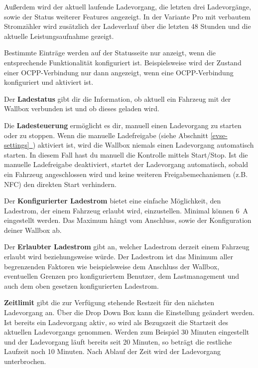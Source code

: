\documentclass[a4paper,10pt]{article}
\newcommand*{\fullref}[1]{Abschnitt \hyperref[{#1}]{\ref*{#1}~\nameref*{#1}}}
\begin{document}
\begin{multicols*}{2}
    Außerdem wird der aktuell laufende Ladevorgang, die letzten drei
    Ladevorgänge, sowie der Status weiterer Features angezeigt.
    In der Variante Pro mit verbautem Stromzähler wird zusätzlich der Ladeverlauf
    über die letzten 48 Stunden und die aktuelle Leistungsaufnahme gezeigt.

    Bestimmte Einträge werden auf der Statusseite nur anzeigt, wenn die entsprechende
    Funktionalität konfiguriert ist. Beispielsweise wird der Zustand einer OCPP-Verbindung
    nur dann angezeigt, wenn eine OCPP-Verbindung konfiguriert und aktiviert ist.

    Der \textbf{Ladestatus} gibt dir die Information, ob aktuell ein
    Fahrzeug mit der Wallbox verbunden ist und ob dieses geladen wird.

    Die \textbf{Ladesteuerung} ermöglicht es dir, manuell einen Ladevorgang zu
    starten oder zu stoppen. Wenn die manuelle Ladefreigabe (siehe \fullref{evse-settings}) aktiviert ist, wird die
    Wallbox niemals einen Ladevorgang automatisch starten. In diesem Fall hast du
    manuell die Kontrolle mittels Start/Stop. Ist die manuelle Ladefreigabe deaktiviert,
    startet der Ladevorgang automatisch, sobald ein Fahrzeug
    angeschlossen wird und keine weiteren Freigabemechanismen (z.B. NFC) den
    direkten Start verhindern.

    Der \textbf{Konfigurierter Ladestrom} bietet eine einfache Möglichkeit, den Ladestrom, der
    einem Fahrzeug erlaubt wird, einzustellen. Minimal können \SI{6}{\ampere} eingestellt werden.
    Das Maximum hängt vom Anschluss, sowie der Konfiguration deiner Wallbox ab.

    Der \textbf{Erlaubter Ladestrom} gibt an, welcher Ladestrom derzeit einem Fahrzeug erlaubt
    wird beziehungsweise würde. Der Ladestrom ist das Minimum aller begrenzenden Faktoren wie
    beispielsweise dem Anschluss der Wallbox, eventuellen Grenzen pro konfiguriertem Benutzer,
    dem Lastmanagement und auch dem oben gesetzen konfigurierten Ladestrom.

    \textbf{Zeitlimit} gibt die zur Verfügung stehende Restzeit für den nächsten
    Ladevorgang an. Über die Drop Down Box kann die Einstellung geändert werden.
    Ist bereits ein Ladevorgang aktiv, so wird als Bezugszeit die Startzeit des
    aktuellen Ladevorgangs genommen. Werden zum Beispiel 30 Minuten eingestellt
    und der Ladevorgang läuft bereits seit 20 Minuten, so beträgt die restliche
    Laufzeit noch 10 Minuten. Nach Ablauf der Zeit wird der Ladevorgang
    unterbrochen.


\end{multicols*}
\end{document}

